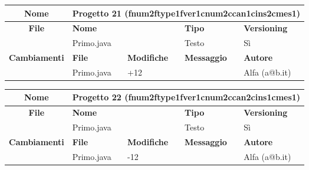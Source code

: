

\begin{table}[ht]
\footnotesize
\begin{tabular}{|c|p{2.5cm}|p{2cm}|p{2.5cm}|p{2.5cm}|}
  \hline
  \textbf{Nome}	& \multicolumn{4}{l|}{Progetto 21 (fnum2ftype1fver1cnum2ccan1cins2cmes1)} 								\\
  \hline
  \rowcolor{lightgray}\textbf{File} 		& \multicolumn{2}{l|}{\textbf{Nome}}		& \textbf{Tipo}		& \textbf{Versioning} 		\\
						\cline{2-5}
						& \multicolumn{2}{l|}{Primo.java}		& Testo			& Sì				\\
  \hline
  \rowcolor{lightgray}\textbf{Cambiamenti}	& \textbf{File}		&\textbf{Modifiche}	& \textbf{Messaggio}	& \textbf{Autore}		\\
						\cline{2-5}
						& Primo.java		& +12	  		& 			& Alfa (a@b.it)			\\
						
  \hline
\end{tabular}
\end{table}


\begin{table}[ht]
\footnotesize
\begin{tabular}{|c|p{2.5cm}|p{2cm}|p{2.5cm}|p{2.5cm}|}
  \hline
  \textbf{Nome}	& \multicolumn{4}{l|}{Progetto 22 (fnum2ftype1fver1cnum2ccan2cins1cmes1)} 								\\
  \hline
  \rowcolor{lightgray}\textbf{File} 		& \multicolumn{2}{l|}{\textbf{Nome}}		& \textbf{Tipo}		& \textbf{Versioning} 		\\
						\cline{2-5}
						& \multicolumn{2}{l|}{Primo.java}		& Testo			& Sì				\\
  \hline
  \rowcolor{lightgray}\textbf{Cambiamenti}	& \textbf{File}		&\textbf{Modifiche}	& \textbf{Messaggio}	& \textbf{Autore}		\\
						\cline{2-5}
						& Primo.java		& -12	  		& 			& Alfa (a@b.it)			\\
						
  \hline
\end{tabular}
\end{table}


